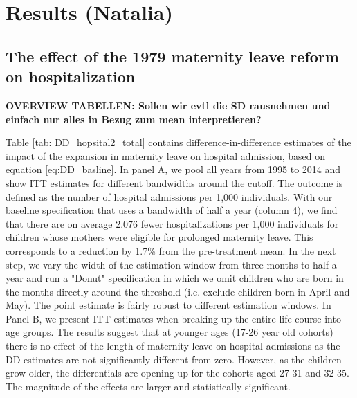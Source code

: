 \documentclass[11pt, a4paper]{article} %
\begin{document}
\section{Results (Natalia)}\label{sec:results}

\subsection[The effect on hospital admission]{The effect of the 1979 maternity leave reform on hospitalization}


\textbf{OVERVIEW TABELLEN: Sollen wir evtl die SD rausnehmen und einfach nur alles in Bezug zum mean interpretieren?}

Table \ref{tab: DD_hopsital2_total} contains difference-in-difference estimates of the impact of the expansion in maternity leave on hospital admission, based on equation \ref{eq:DD_basline}. In panel A, we pool all years from 1995 to 2014 and show ITT estimates for different bandwidths around the cutoff. The outcome is defined as the number of hospital admissions per 1,000 individuals. With our baseline specification that uses a bandwidth of half a year (column 4), we find that there are on average 2.076 fewer hospitalizations per 1,000 individuals for children whose mothers were eligible for prolonged maternity leave. This corresponds to a reduction by 1.7\% from the pre-treatment mean. In the next step, we vary the width of the estimation window from three months to half a year and run a "Donut" specification in which we omit children who are born in the months directly around the threshold (i.e. exclude children born in April and May). The point estimate is fairly robust to different estimation windows.  \newline 
In Panel B, we present ITT estimates when breaking up the entire life-course into age groups. The results suggest that at younger ages (17-26 year old cohorts) there is no effect of the length of maternity leave on hospital admissions as the DD estimates are not significantly different from zero. However, as the children grow older, the differentials are opening up for the cohorts aged 27-31 and 32-35. The magnitude of the effects are larger and statistically significant. \newline
\end{document}
